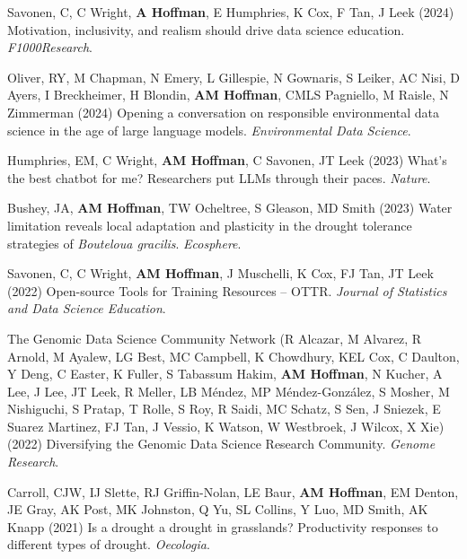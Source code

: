 \documentclass{cv}
\begin{document}
\begin{pubenum}
\item Savonen, C, C Wright, \textbf{A Hoffman}, E Humphries, K Cox, F Tan, J Leek (2024) Motivation, inclusivity, and realism should drive data science education. \textit{F1000Research}. 

\item Oliver, RY, M Chapman, N Emery, L Gillespie, N Gownaris, S Leiker, AC Nisi, D Ayers, I Breckheimer, H Blondin, \textbf{AM Hoffman}, CMLS Pagniello, M Raisle, N Zimmerman (2024) Opening a conversation on responsible environmental data science in the age of large language models. \textit{Environmental Data Science}. 

\item Humphries, EM, C Wright, \textbf{AM Hoffman}, C Savonen, JT Leek (2023) What's the best chatbot for me? Researchers put LLMs through their paces. \textit{Nature}. 

\item Bushey, JA, \textbf{AM Hoffman}, TW Ocheltree, S Gleason, MD Smith (2023) Water limitation reveals local adaptation and plasticity in the drought tolerance strategies of \textit{Bouteloua gracilis}. \textit{Ecosphere}. 

\item Savonen, C, C Wright, \textbf{AM Hoffman}, J Muschelli, K Cox, FJ Tan, JT Leek (2022) Open-source Tools for Training Resources -- OTTR. \textit{Journal of Statistics and Data Science Education}. 

\item The Genomic Data Science Community Network (R Alcazar, M Alvarez, R Arnold, M Ayalew, LG Best, MC Campbell, K Chowdhury, KEL Cox, C Daulton, Y Deng, C Easter, K Fuller, S Tabassum Hakim, \textbf{AM Hoffman}\footnotemark[1], N Kucher, A Lee, J Lee, JT Leek, R Meller, LB Méndez, MP Méndez-González, S Mosher, M Nishiguchi, S Pratap, T Rolle, S Roy, R Saidi, MC Schatz, S Sen, J Sniezek, E Suarez Martinez, FJ Tan, J Vessio, K Watson, W Westbroek, J Wilcox, X Xie) (2022) Diversifying the Genomic Data Science Research Community. \textit{Genome Research}. 

\item Carroll, CJW, IJ Slette, RJ Griffin-Nolan, LE Baur, \textbf{AM Hoffman}, EM Denton, JE Gray, AK Post, MK Johnston, Q Yu, SL Collins, Y Luo, MD Smith, AK Knapp (2021) Is a drought a drought in grasslands? Productivity responses to different types of drought. \textit{Oecologia}. 


\end{pubenum}
\end{document}
